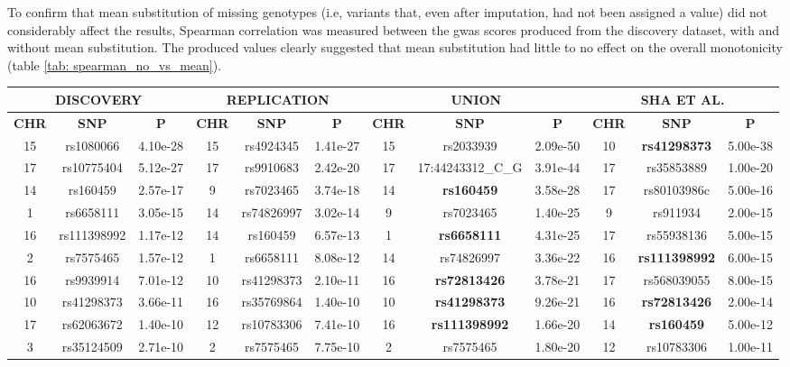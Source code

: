 To confirm that mean substitution of missing genotypes (i.e, variants that, even after imputation, had not been assigned a value) did not considerably affect the results, Spearman correlation was measured between the \ac{gwas} scores produced from the discovery dataset, with and without mean substitution. The produced values clearly suggested that mean substitution had little to no effect on the overall monotonicity (table \autoref{tab: spearman_no_vs_mean}).
\begin{table}[H]
\begin{adjustwidth}{-3 cm}{-2.5 cm}\centering\begin{threeparttable}[!htb]	
		\scriptsize
		\begin{tabular}{ccc||ccc||ccc||ccc}\toprule
			\multicolumn{3}{c}{\textbf{DISCOVERY}} &\multicolumn{3}{c}{\textbf{REPLICATION}} &\multicolumn{3}{c}{\textbf{UNION}} &\multicolumn{3}{c}{\textbf{SHA ET AL.}} \\\midrule
			\textbf{CHR} &\textbf{SNP} &\textbf{P} &\textbf{CHR} &\textbf{SNP} &\textbf{P} &\textbf{CHR} &\textbf{SNP} &\textbf{P} &\textbf{CHR} &\textbf{SNP} &\textbf{P} \\
			15 &rs1080066 &4.10e-28 &15 &rs4924345 &1.41e-27 &15 &rs2033939 &2.09e-50 &10 &\textbf{rs41298373} &5.00e-38 \\
			17 &rs10775404 &5.12e-27 &17 &rs9910683 &2.42e-20 &17 &17:44243312\_C\_G &3.91e-44 &17 &rs35853889 &1.00e-20 \\
			14 &rs160459 &2.57e-17 &9 &rs7023465 &3.74e-18 &14 &\textbf{rs160459} &3.58e-28 &17 &rs80103986c &5.00e-16 \\
			1 &rs6658111 &3.05e-15 &14 &rs74826997 &3.02e-14 &9 &rs7023465 &1.40e-25 &9 &rs911934 &2.00e-15 \\
			16 &rs111398992 &1.17e-12 &14 &rs160459 &6.57e-13 &1 &\textbf{rs6658111} &4.31e-25 &17 &rs55938136 &5.00e-15 \\
			2 &rs7575465 &1.57e-12 &1 &rs6658111 &8.08e-12 &14 &rs74826997 &3.36e-22 &16 &\textbf{rs111398992} &6.00e-15 \\
			16 &rs9939914 &7.01e-12 &10 &rs41298373 &2.10e-11 &16 &\textbf{rs72813426} &3.78e-21 &17 &rs568039055 &8.00e-15 \\
			10 &rs41298373 &3.66e-11 &16 &rs35769864 &1.40e-10 &10 &\textbf{rs41298373} &9.26e-21 &16 &\textbf{rs72813426} &2.00e-14 \\
			17 &rs62063672 &1.40e-10 &12 &rs10783306 &7.41e-10 &16 &\textbf{rs111398992} &1.66e-20 &14 &\textbf{rs160459} &5.00e-12 \\
			3 &rs35124509 &2.71e-10 &2 &rs7575465 &7.75e-10 &2 &rs7575465 &1.80e-20 &12 &rs10783306 &1.00e-11 \\

\end{tabular}
\end{threeparttable}
\end{adjustwidth}
\end{table}

